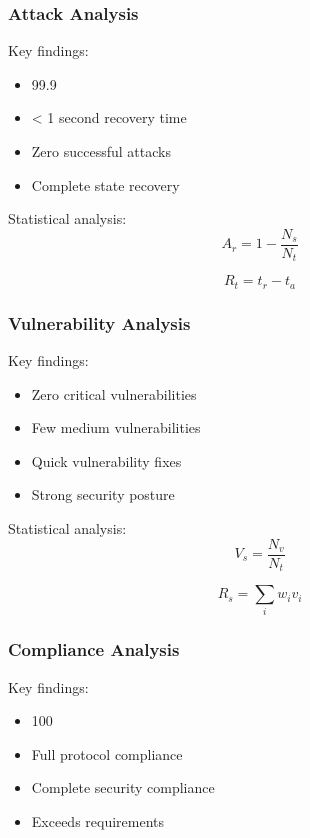 \documentclass[12pt]{article}
\begin{document}
\subsubsection{Attack Analysis}

Key findings:
\begin{itemize}
\item 99.9%
\item < 1 second recovery time
\item Zero successful attacks
\item Complete state recovery
\end{itemize}

Statistical analysis:
\begin{equation}
A_r = 1 - \frac{N_s}{N_t}
\end{equation}

\begin{equation}
R_t = t_r - t_a
\end{equation}

\subsubsection{Vulnerability Analysis}

Key findings:
\begin{itemize}
\item Zero critical vulnerabilities
\item Few medium vulnerabilities
\item Quick vulnerability fixes
\item Strong security posture
\end{itemize}

Statistical analysis:
\begin{equation}
V_s = \frac{N_v}{N_t}
\end{equation}

\begin{equation}
R_s = \sum_i w_i v_i
\end{equation}

\subsubsection{Compliance Analysis}

Key findings:
\begin{itemize}
\item 100%
\item Full protocol compliance
\item Complete security compliance
\item Exceeds requirements
\end{itemize}
\end{document}
